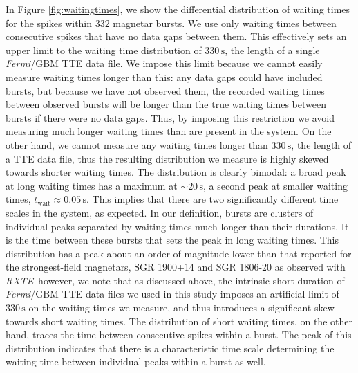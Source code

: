 \documentclass[12pt]{emulateapj}
\newcommand{\project}[1]{\textsl{#1}}
\newcommand{\fermi}{\project{Fermi}}
\newcommand{\rxte}{\project{RXTE}}
\begin{document}
In Figure \ref{fig:waitingtimes}, we show the differential distribution of waiting times for the spikes within $332$ magnetar bursts. We use only waiting times 
between consecutive spikes that have no data gaps between them. This effectively sets an upper limit to the waiting time distribution of $330\,\mathrm{s}$,
the length of a single \fermi/GBM TTE data file. We impose this limit because we cannot easily measure waiting times longer than this: any data gaps could 
have included bursts, but because we have not observed them, the recorded waiting times between observed bursts will be longer than the true waiting times
between bursts if there were no data gaps. Thus, by imposing this restriction we avoid measuring much longer waiting times than are present in the system.
On the other hand, we cannot measure any waiting times longer than $330\,\mathrm{s}$, the length of a TTE data file, thus the resulting distribution we measure is
highly skewed towards shorter waiting times.
 The distribution is clearly bimodal: a broad peak at long waiting times has a maximum at $\sim\!\! 20 \,\mathrm{s}$, a
second peak at smaller waiting times, $t_\mathrm{wait} \approx 0.05 \,\mathrm{s}$. This implies that there are two significantly different time scales
in the system, as expected. In our definition, bursts are clusters of individual peaks separated by
waiting times much longer than their durations. It is the time between these bursts that sets the peak in long waiting times. This distribution has a peak about
an order of magnitude lower than that reported for the strongest-field magnetars, SGR 1900+14 \citep{gogus1999} and SGR 1806-20 \citep{gogus2000} as observed
with \rxte\, however, we note that as discussed above, the intrinsic short duration of \fermi/GBM TTE data files we used in this study imposes an 
artificial limit of $330\,\mathrm{s}$ on the waiting times we measure,
and thus introduces a significant skew towards short waiting times. 
The distribution of short waiting times, on the other hand, traces the time between consecutive spikes within a burst. The peak of this distribution indicates
that there is a characteristic time scale determining the waiting time between individual peaks within a burst as well. 
\end{document}
